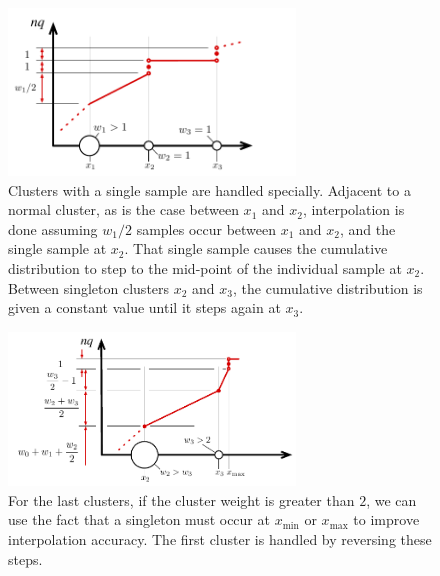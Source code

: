 \documentclass[]{statsoc}
\begin{document}
\begin{figure}[p] %
   \centering
   \includegraphics[width=3in]{quantile-figures/singleton.pdf} 
   \caption{Clusters with a single sample are handled specially. Adjacent to a normal cluster, as is the case between $x_1$ and $x_2$, interpolation is done assuming $w_1/2$ samples occur between $x_1$ and $x_2$, and the single sample at $x_2$. That single sample causes the cumulative distribution to step to the mid-point of the individual sample at $x_2$. Between singleton clusters $x_2$ and $x_3$, the cumulative distribution is given a constant value until it steps again at $x_3$.}
   \label{fig:singletons}
\end{figure}
\begin{figure}[p] %
   \centering
   \includegraphics[width=3in]{quantile-figures/endpoint.pdf} 
   \caption{For the last clusters, if the cluster weight is greater than $2$, we can use the fact that a singleton must occur at $x_{\mathrm {min}}$ or $x_{\mathrm {max}}$ to improve interpolation accuracy. The first cluster is handled by reversing these steps.}
   \label{fig:endpoint}
\end{figure}
\end{document}
